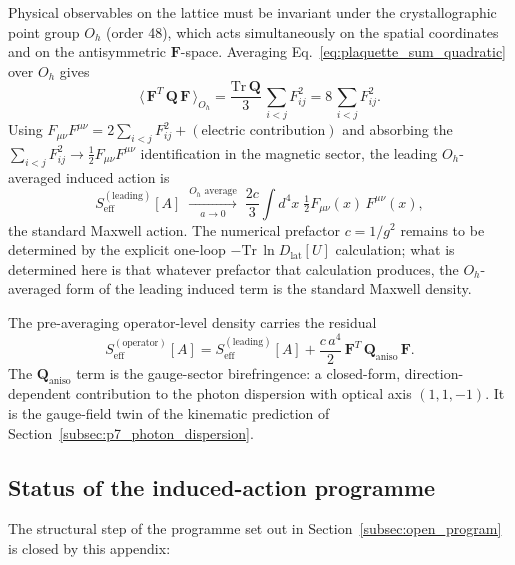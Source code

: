 Physical observables on the lattice must be invariant under the
crystallographic point group $O_h$ (order 48), which acts
simultaneously on the spatial coordinates and on the antisymmetric
$\mathbf{F}$-space.  Averaging
Eq.~\eqref{eq:plaquette_sum_quadratic} over $O_h$ gives
\begin{equation}
    \bigl\langle\,\mathbf{F}^{\!T}\,\mathbf{Q}\,\mathbf{F}\,\bigr\rangle_{O_h}
        = \frac{\mathrm{Tr}\,\mathbf{Q}}{3}\,
            \sum_{i<j} F_{ij}^2
        = 8\,\sum_{i<j} F_{ij}^2.
    \label{eq:Oh_averaged}
\end{equation}
Using $F_{\mu\nu} F^{\mu\nu} = 2\sum_{i<j}F_{ij}^2 + (\text{electric
contribution})$ and absorbing the
$\sum_{i<j} F_{ij}^2 \to \tfrac{1}{2}F_{\mu\nu}F^{\mu\nu}$
identification in the magnetic sector, the leading $O_h$-averaged
induced action is
\begin{equation}
    S_\text{eff}^{(\text{leading})}[A]
        \;\xrightarrow[a\to 0]{O_h\text{ average}}\;
        \frac{2 c}{3}\int d^4x\;
            \tfrac{1}{2}F_{\mu\nu}(x)\,F^{\mu\nu}(x),
    \label{eq:Maxwell_recovered}
\end{equation}
the standard Maxwell action.  The numerical prefactor $c = 1/g^2$
remains to be determined by the explicit one-loop
$-\mathrm{Tr}\,\ln D_\text{lat}[U]$ calculation; what is determined
here is that whatever prefactor that calculation produces, the
$O_h$-averaged form of the leading induced term is the standard
Maxwell density.

The pre-averaging operator-level density carries the residual
\begin{equation}
    S_\text{eff}^{(\text{operator})}[A]
        = S_\text{eff}^{(\text{leading})}[A]
        + \frac{c\,a^4}{2}\,\mathbf{F}^{\!T}\,\mathbf{Q}_\text{aniso}\,\mathbf{F}.
    \label{eq:operator_residual}
\end{equation}
The $\mathbf{Q}_\text{aniso}$ term is the gauge-sector birefringence:
a closed-form, direction-dependent contribution to the photon
dispersion with optical axis $(1,1,-1)$.  It is the gauge-field
twin of the kinematic prediction of
Section~\ref{subsec:p7_photon_dispersion}.

\subsection{Status of the induced-action programme}
\label{subsec:induced_status}

The structural step of the programme set out in
Section~\ref{subsec:open_program} is closed by this appendix:

